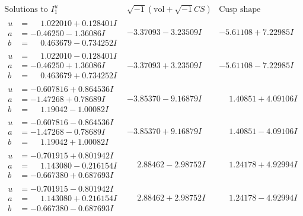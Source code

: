 \documentclass[1p]{elsarticle_modified}
\theoremstyle{definition}
\newcommand{\I}{\sqrt{-1}}
\begin{document}
$$\begin{array}{c|c|c}  
\text{Solutions to }I^u_{1}& \I (\text{vol} + \sqrt{-1}CS) & \text{Cusp shape}\\
 \hline 
\begin{aligned}
u &= \phantom{-}1.022010 + 0.128401 I \\
a &= -0.46250 - 1.36086 I \\
b &= \phantom{-}0.463679 - 0.734252 I\end{aligned}
 & -3.37093 - 3.23509 I & -5.61108 + 7.22985 I \\ \hline\begin{aligned}
u &= \phantom{-}1.022010 - 0.128401 I \\
a &= -0.46250 + 1.36086 I \\
b &= \phantom{-}0.463679 + 0.734252 I\end{aligned}
 & -3.37093 + 3.23509 I & -5.61108 - 7.22985 I \\ \hline\begin{aligned}
u &= -0.607816 + 0.864536 I \\
a &= -1.47268 + 0.78689 I \\
b &= \phantom{-}1.19042 - 1.00082 I\end{aligned}
 & -3.85370 - 9.16879 I & \phantom{-}1.40851 + 4.09106 I \\ \hline\begin{aligned}
u &= -0.607816 - 0.864536 I \\
a &= -1.47268 - 0.78689 I \\
b &= \phantom{-}1.19042 + 1.00082 I\end{aligned}
 & -3.85370 + 9.16879 I & \phantom{-}1.40851 - 4.09106 I \\ \hline\begin{aligned}
u &= -0.701915 + 0.801942 I \\
a &= \phantom{-}1.143080 - 0.216154 I \\
b &= -0.667380 + 0.687693 I\end{aligned}
 & \phantom{-}2.88462 - 2.98752 I & \phantom{-}1.24178 + 4.92994 I \\ \hline\begin{aligned}
u &= -0.701915 - 0.801942 I \\
a &= \phantom{-}1.143080 + 0.216154 I \\
b &= -0.667380 - 0.687693 I\end{aligned}
 & \phantom{-}2.88462 + 2.98752 I & \phantom{-}1.24178 - 4.92994 I \\ \hline\begin{aligned}

\end{aligned}
\end{array}$$
\end{document}
